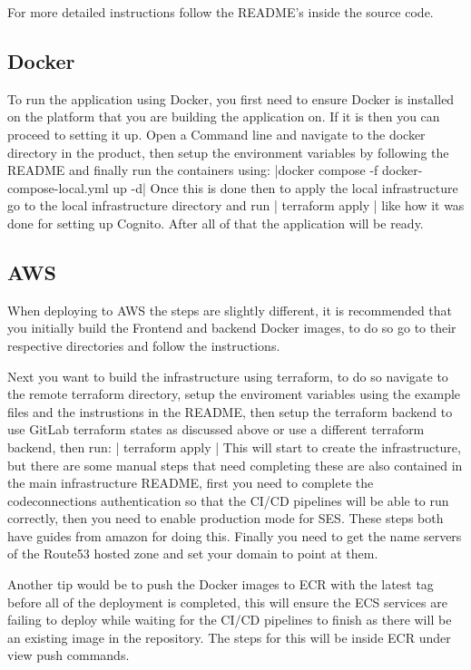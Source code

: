 \documentclass[]{project_report}
\begin{document}
For more detailed instructions follow the README's inside the source code.

\subsection{Docker}
To run the application using Docker, you first need to ensure Docker is installed on the platform that you are building the application on. If it is then you can proceed to setting it up. Open a Command line and navigate to the docker directory in the product, then setup the environment variables by following the README and finally run the containers using: |docker compose -f docker-compose-local.yml up -d| Once this is done then to apply the local infrastructure go to the local infrastructure directory and run  | terraform apply | like how it was done for setting up Cognito. After all of that the application will be ready.

\subsection{AWS}

When deploying to AWS the steps are slightly different, it is recommended that you initially build the Frontend and backend Docker images, to do so go to their respective directories and follow the instructions. 

Next you want to build the infrastructure using terraform, to do so navigate to the remote terraform directory, setup the enviroment variables using the example files and the instrustions in the README, then setup the terraform backend to use GitLab terraform states as discussed above or use a different terraform backend, then run: | terraform apply |
This will start to create the infrastructure, but there are some manual steps that need completing these are also contained in the main infrastructure README, first you need to complete the codeconnections authentication so that the CI/CD pipelines will be able to run correctly, then you need to enable production mode for SES. These steps both have guides from amazon for doing this. Finally you need to get the name servers of the Route53 hosted zone and set your domain to point at them. 

Another tip would be to push the Docker images to ECR with the latest tag before all of the deployment is completed, this will ensure the ECS services are failing to deploy while waiting for the CI/CD pipelines to finish as there will be an existing image in the repository. The steps for this will be inside ECR under view push commands. 
\end{document}
